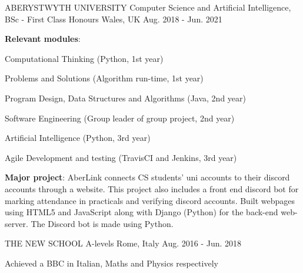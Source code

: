 

\begin{cventries}

  \cventry
    {ABERYSTWYTH UNIVERSITY} %
    {Computer Science and Artificial Intelligence, BSc - First Class Honours} %
    {Wales, UK} %
    {Aug. 2018 - Jun. 2021} %
    {
      \begin{cvitems} %
        \item {\textbf{Relevant modules}:}\\
        \begin{cvitems}
          \item {Computational Thinking (Python, 1st year)}
          \item {Problems and Solutions (Algorithm run-time, 1st year)}
          \item {Program Design, Data Structures and Algorithms (Java, 2nd year)}
          \item {Software Engineering (Group leader of group project, 2nd year)}
          \item {Artificial Intelligence (Python, 3rd year)}
          \item {Agile Development and testing (TravisCI and Jenkins, 3rd year)}\\
        \end{cvitems}
        \item {\textbf{Major project}: AberLink connects CS students' uni accounts to their discord accounts through a website. This project also includes a front end discord bot for marking attendance in practicals and verifying discord accounts. Built webpages using HTML5 and JavaScript along with Django (Python) for the back-end web-server. The Discord bot is made using Python.}
      \end{cvitems}
    }
    
  \cventry
    {THE NEW SCHOOL} %
    {A-levels} %
    {Rome, Italy} %
    {Aug. 2016 - Jun. 2018} %
    {
      \begin{cvitems} %
        \item {Achieved a BBC in Italian, Maths and Physics respectively}
      \end{cvitems}
    }
    

\end{cventries}
